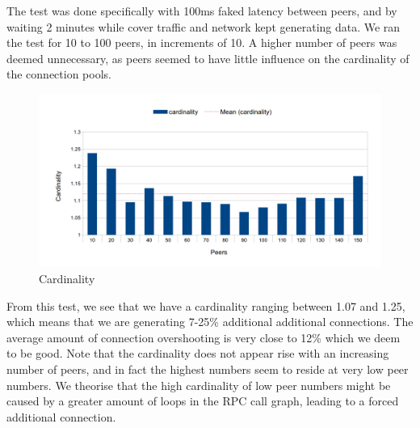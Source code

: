 The test was done specifically with 100ms faked latency between peers, and by waiting 2 minutes while cover traffic and network kept generating data. We ran the test for 10 to 100 peers, in increments of 10. A higher number of peers was deemed unnecessary, as peers seemed to have little influence on the cardinality of the connection pools.

\begin{figure}
\caption{Cardinality}
\label{graph_cardinality}
\includegraphics[width=\textwidth]{../Grapes/DH_pools_cardinality_graph.png}
\end{figure}

From this test, we see that we have a cardinality ranging between 1.07 and 1.25, which means that we are generating 7-25\% additional additional connections. The average amount of connection overshooting is very close to 12\% which we deem to be good. Note that the cardinality does not appear rise with an increasing number of peers, and in fact the highest numbers seem to reside at very low peer numbers. We theorise that the high cardinality of low peer numbers might be caused by a greater amount of loops in the RPC call graph, leading to a forced additional connection.